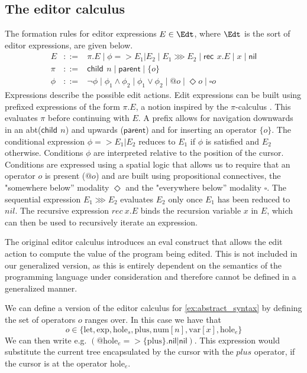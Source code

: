 \documentclass[sigplan,review]{acmart}
\newcommand{\abt}{\textsf{abt}\xspace}
\newcommand{\ec}[1]{\ensuremath{\textsf{#1}}\xspace}
\newcommand{\rec}{\ec{rec}\,}
\newcommand{\chld}{\ec{child}\,}
\newcommand{\parnt}{\ec{parent}}
\newcommand{\nil}{\ec{nil}}
\begin{document}
\subsection{The editor calculus}
The formation rules for editor expressions $E \in \Edt$, where $\Edt$ is the sort of editor
expressions, are given below.
%
\begin{align*}
  E & ::= & \pi.E  \mid  \phi => E_1|E_2  \mid  E_1 \ggg E_2  \mid  \rec  \ x.E  \mid  x  \mid  \nil  \\
    \pi & ::= & \chld  \ n  \mid  \parnt   \mid  \{o\} \\
    \phi & ::= & \neg\phi  \mid  \phi_1 \wedge \phi_2  \mid  \phi_1 \vee \phi_2  \mid  @o  \mid  \Diamond o  \mid  \square o
\end{align*}
%
Expressions describe the possible edit actions. Edit expressions can
be built using prefixed expressions of the form $\pi.E$, a notion
inspired by the $\pi$-calculus \cite{picalculus}. This
evaluates $\pi$ before continuing with $E$. A prefix allows for
navigation downwards in an \abt ($\chld \ n$) and upwards ($\parnt$)
and for inserting an operator $\{ o \}$. The conditional expression
$\phi => E_1|E_2$ reduces to $E_1$ if $\phi$ is satisfied and $E_2$
otherwise. Conditions $\phi$ are interpreted relative to the position
of the cursor. Conditions are expressed using a spatial logic
\cite{CAIRES2003194} that allows us to require that an operator $o$ is
present ($@o$) and are built using propositional connectives, the
"somewhere below'' modality $\Diamond$ and the "everywhere below''
modality $\square$. The sequential expression $E_1 \ggg E_2$ evaluates
$E_2$ only once $E_1$ has been reduced to $nil$. The recursive
expression $rec \ x.E$ binds the recursion variable $x$ in $E$, which
can then be used to recursively iterate an expression.

The original editor calculus \cite{type_safe_structure_editor}
introduces an \textsf{eval} construct that allows the edit action to
compute the value of the program being edited. This is not included in
our generalized version, as this is entirely dependent on the
semantics of the programming language under consideration and
therefore cannot be defined in a generalized manner.

\begin{example}\label{ex:editor_calculus}
    We can define a version of the editor calculus for
    \cref{ex:abstract_syntax} by defining the set of operators $o$ ranges over. In this case we have that
    \begin{equation*}
        o \in \{ \text{let}, \text{exp}, \text{hole}_s, \text{plus}, \text{num}[n], \text{var}[x], \text{hole}_e \}
    \end{equation*}
    We can then write e.g. $(@\text{hole}_e =>
    \{\text{plus}\}.\nil |\nil )$. This expression would
    substitute the current tree encapsulated by the cursor with the
    $plus$ operator, if the cursor is at the operator
    $\text{hole}_e$.
\end{example}
\end{document}
